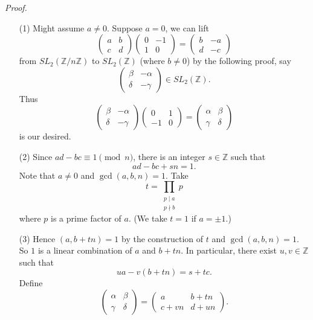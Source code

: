 \documentclass{article}
\begin{document}
\emph{Proof.}
\begin{enumerate}
\item[(1)]
  Might assume $a \neq 0$.
  Suppose $a = 0$, we can lift
  \[
    \begin{pmatrix}
      a & b \\
      c & d
    \end{pmatrix}
    \begin{pmatrix}
      0 & -1 \\
      1 & 0
    \end{pmatrix}
    =
    \begin{pmatrix}
      b & -a \\
      d & -c
    \end{pmatrix}
  \]
  from $SL_2(\mathbb{Z}/n\mathbb{Z})$ to $SL_2(\mathbb{Z})$ (where $b \neq 0$)
  by the following proof,
  say
  \[
    \begin{pmatrix}
      \beta & -\alpha \\
      \delta & -\gamma
    \end{pmatrix} \in SL_2(\mathbb{Z}).
  \]
  Thus
  \[
    \begin{pmatrix}
      \beta & -\alpha \\
      \delta & -\gamma
    \end{pmatrix}
    \begin{pmatrix}
      0 & 1 \\
      -1 & 0
    \end{pmatrix}
    =
    \begin{pmatrix}
      \alpha & \beta \\
      \gamma & \delta
    \end{pmatrix}
  \]
  is our desired.

\item[(2)]
  Since $ad - bc \equiv 1 \pmod{n}$,
  there is an integer $s \in \mathbb{Z}$ such that
  \[
    ad - bc + sn = 1.
  \]
  Note that $a \neq 0$ and $\gcd(a,b,n) = 1$.
  Take
  \[
    t = \prod_{\substack{p \mid a \\ p \nmid b}} p
  \]
  where $p$ is a prime factor of $a$. (We take $t = 1$ if $a = \pm 1$.)

\item[(3)]
  Hence $(a, b + tn) = 1$ by the construction of $t$ and $\gcd(a,b,n) = 1$.
  So $1$ is a linear combination of $a$ and $b + tn$.
  In particular, there exist $u, v \in \mathbb{Z}$ such that
  \[
    ua - v(b + tn) = s + tc.
  \]
  Define
  \[
    \begin{pmatrix}
      \alpha & \beta \\
      \gamma & \delta
    \end{pmatrix}
    =
    \begin{pmatrix}
      a & b + tn \\
      c + vn & d + un
    \end{pmatrix}.
  \]


\end{enumerate}
\end{document}
